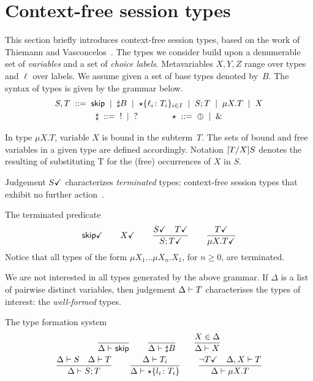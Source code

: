 \section{Context-free session types}
\label{sec:contextfreesession}

This section briefly introduces context-free session types, based on
the work of Thiemann and Vasconcelos~\cite{thiemann2016context}.
%
The types we consider build upon a denumerable set of \emph{variables}
and a set of \emph{choice labels}.  Metavariables $X,Y,Z$ range over
types and $\ell$ over labels.
%
We assume given a set of base types denoted by~$B$.
The syntax of types is given by the grammar below.
%
\begin{gather*}
  S,T \grmeq \skipk \grmor \sharp B \grmor 
  \star\{\ell_i\colon T_i\}_{i\in I} \grmor S;T \grmor \mu X.T \grmor X
  \\
  \sharp \grmeq {}! \grmor {}? 
  \qquad \qquad
  \star  \grmeq \oplus \grmor {}\&
\end{gather*}

In type $\mu X.T$, variable $X$ is bound in the subterm~$T$. The sets
of bound and free variables in a given type are defined
accordingly. Notation $\subs{T}{X}S$ denotes the resulting of
substituting T for the (free) occurrences of $X$ in $S$.

Judgement $\DONE S$ characterizes \emph{terminated} types:
context-free session types that exhibit no further
action~\cite{DBLP:journals/jacm/AcetoH92}.

\noindent The terminated predicate\hfill{} 
%
\begin{gather*}
  \DONE{\skipk}
  \qquad 
  \DONE X
  \qquad
  \frac{\DONE{S} \quad \DONE{T}}{\DONE{S; T}}
  \qquad
  \frac{\DONE T}{\DONE{\mu X.T}}
\end{gather*}
%
Notice that all types of the form $\mu X_1\dots\mu X_n.X_1$, for
$n\ge0$, are terminated.

We are not interested in all types generated by the above grammar.
%
If $\Delta$ is a list of pairwise distinct variables, then judgement
$\isType T$ characterises the types of interest: the
\emph{well-formed} types.

\noindent The type formation system \hfill{}
%
\begin{gather*}
  \frac{} 
  {
    \isType \skipk
  }
  \qquad
  \frac{}
  {
    \isType {\sharp B}
  }
  \qquad
  \frac{
    X \in \Delta
  }{
    \isType{X}
  }
  \\
  \frac{
    \isType{S}
    \quad
    \isType{T}
  }{
    \isType{S;T}
  }
  \qquad
  \frac{
    \isType{T_i}
  }{
    \isType{\star 
      \{ l_i \colon T_i\}}
  }
  \qquad
  \frac{
    \neg\DONE T
    \quad 
    \isType [\Delta, X] T
  }{
    \isType {\mu X. T}
  }
\end{gather*}

